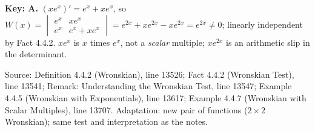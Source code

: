 \documentclass[11pt,a4paper]{article}
\newcommand{\Src}[1]{{\footnotesize\color{black!65}Source: #1}}
\begin{document}
\textbf{Key: A.} $(xe^{x})'=e^{x}+xe^{x}$, so $W(x)=\begin{vmatrix}e^{x}&xe^{x}\\e^{x}&e^{x}+xe^{x}\end{vmatrix}=e^{2x}+xe^{2x}-xe^{2x}=e^{2x}\neq0$; linearly independent by Fact 4.4.2. $xe^{x}$ is $x$ times $e^{x}$, not a \emph{scalar} multiple; $xe^{2x}$ is an arithmetic slip in the determinant.\par
\Src{Definition 4.4.2 (Wronskian), line 13526; Fact 4.4.2 (Wronskian Test), line 13541; Remark: Understanding the Wronskian Test, line 13547; Example 4.4.5 (Wronskian with Exponentials), line 13617; Example 4.4.7 (Wronskian with Scalar Multiples), line 13707. Adaptation: new pair of functions ($2\times2$ Wronskian); same test and interpretation as the notes.}\par
\end{document}
